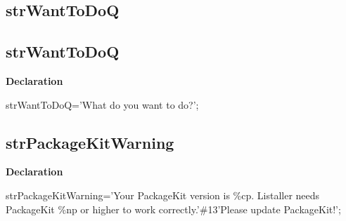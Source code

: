 \documentclass{report}
\newif\ifpdf
\begin{document}
\subsection*{\large{\textbf{strWantToDoQ}}\normalsize\hspace{1ex}\hrulefill}
\else
\subsection*{strWantToDoQ}
\fi
\label{trstrings-strWantToDoQ}
\begin{list}{}{
\setlength{\itemindent}{0cm}
\setlength{\listparindent}{0cm}
\setlength{\leftmargin}{\evensidemargin}
\addtolength{\leftmargin}{\tmplength}
\settowidth{\labelsep}{X}
\addtolength{\leftmargin}{\labelsep}
\setlength{\labelwidth}{\tmplength}
}
\item[\textbf{Declaration}\hfill]
\ifpdf
\begin{flushleft}
\fi
\begin{ttfamily}
strWantToDoQ='What do you want to do?';\end{ttfamily}

\ifpdf
\end{flushleft}
\fi

\end{list}
\ifpdf
\subsection*{\large{\textbf{strPackageKitWarning}}\normalsize\hspace{1ex}\hrulefill}
\else
\subsection*{strPackageKitWarning}
\fi
\label{trstrings-strPackageKitWarning}
\begin{list}{}{
\setlength{\itemindent}{0cm}
\setlength{\listparindent}{0cm}
\setlength{\leftmargin}{\evensidemargin}
\addtolength{\leftmargin}{\tmplength}
\settowidth{\labelsep}{X}
\addtolength{\leftmargin}{\labelsep}
\setlength{\labelwidth}{\tmplength}
}
\item[\textbf{Declaration}\hfill]
\ifpdf
\begin{flushleft}
\fi
\begin{ttfamily}
strPackageKitWarning='Your PackageKit version is {\%}cp. Listaller needs PackageKit {\%}np or higher to work correctly.'{\#}13'Please update PackageKit!';\end{ttfamily}

\ifpdf
\end{flushleft}
\fi

\end{list}
\ifpdf
\end{document}
